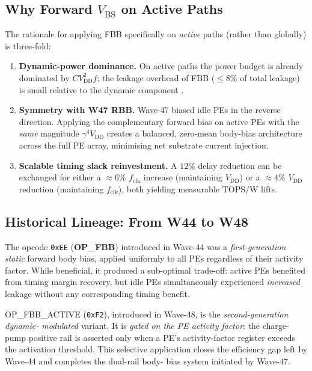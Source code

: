 \documentclass[12pt,a4paper]{report}
\theoremstyle{plain}
\theoremstyle{definition}
\theoremstyle{remark}
\newcommand{\opcode}[1]{\texttt{#1}}
\newcommand{\vdd}{V_{\mathrm{DD}}}
\newcommand{\gammaFour}{\gamma^{4}}
\newcommand{\topsw}{\mathrm{TOPS/W}}
\newcommand{\fclk}{f_{\mathrm{clk}}}
\begin{document}
\subsection{Why Forward $V_{\mathrm{BS}}$ on Active Paths}

The rationale for applying FBB specifically on \emph{active} paths (rather than globally) is
three-fold:

\begin{enumerate}[leftmargin=2em]
  \item \textbf{Dynamic-power dominance.}  On active paths the power budget is already dominated
        by $C \vdd^{2} f$; the leakage overhead of FBB ($\leq 8\%$ of total leakage) is
        small relative to the dynamic component \citep{mukhopadhyay_2009}.
  \item \textbf{Symmetry with W47 RBB.}  Wave-47 biased idle PEs in the reverse direction.
        Applying the complementary forward bias on active PEs with the \emph{same} magnitude
        $\gammaFour \vdd$ creates a balanced, zero-mean body-bias architecture across the full
        PE array, minimising net substrate current injection.
  \item \textbf{Scalable timing slack reinvestment.}  A $12\%$ delay reduction can be exchanged
        for either a $\approx 6\%$ $\fclk$ increase (maintaining $\vdd$) or a $\approx 4\%$
        $\vdd$ reduction (maintaining $\fclk$), both yielding measurable $\topsw$ lifts.
\end{enumerate}

\subsection{Historical Lineage: From W44 to W48}

The opcode \opcode{0xEE} (\textbf{OP\_FBB}) introduced in Wave-44 was a \emph{first-generation
static} forward body bias, applied uniformly to all PEs regardless of their activity factor.
While beneficial, it produced a sub-optimal trade-off: active PEs benefited from timing margin
recovery, but idle PEs simultaneously experienced \emph{increased} leakage without any
corresponding timing benefit.

OP\_FBB\_ACTIVE (\opcode{0xF2}), introduced in Wave-48, is the \emph{second-generation dynamic-
modulated} variant.  It is \emph{gated on the PE activity factor}: the charge-pump positive rail
is asserted only when a PE's activity-factor register exceeds the activation threshold.  This
selective application closes the efficiency gap left by Wave-44 and completes the dual-rail body-
bias system initiated by Wave-47.
\end{document}
